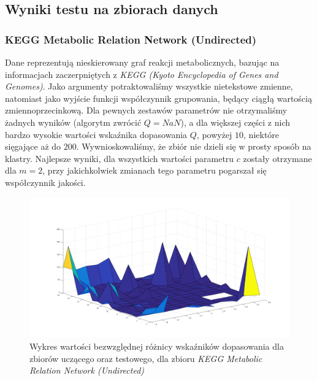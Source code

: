 \documentclass[a4paper; 11pt]{article}
\begin{document}
\subsection{Wyniki testu na zbiorach danych}
\subsubsection{KEGG Metabolic Relation Network (Undirected)}
Dane reprezentują nieskierowany graf reakcji metabolicznych, bazując na informacjach zaczerpniętych
z \emph{KEGG (Kyoto Encyclopedia of Genes and Genomes)}. Jako argumenty potraktowaliśmy wszystkie
nietekstowe zmienne, natomiast jako wyjście funkcji współczynnik grupowania, będący ciągłą
wartością zmiennoprzecinkową. Dla pewnych zestawów parametrów nie otrzymaliśmy żadnych wyników
(algorytm zwrócić $Q = NaN$), a dla większej części z nich bardzo wysokie wartości wskaźnika
dopasowania $Q$, powyżej $10$, niektóre sięgające aż do $200$. Wywnioskowaliśmy, że zbiór nie dzieli
się w prosty sposób na klastry. Najlepsze wyniki, dla wszystkich wartości parametru $c$ zostały otrzymane
dla $m = 2$, przy jakichkolwiek zmianach tego parametru pogarszał się współczynnik jakości.

\begin{figure}[h]
\begin{center}
\includegraphics[scale=.3]{dq_kegg.png}
\caption{Wykres wartości bezwzględnej różnicy wskaźników dopasowania dla zbiorów uczącego oraz testowego, dla zbioru \emph{KEGG Metabolic Relation Network (Undirected)}}
\end{center}
\end{figure}
\end{document}
